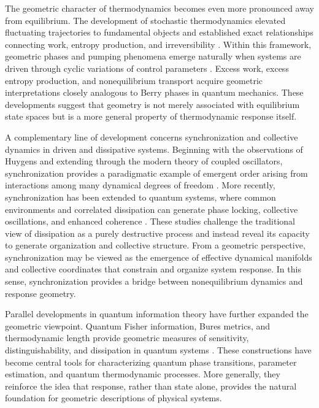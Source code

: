 The geometric character of thermodynamics becomes even more pronounced away from equilibrium. The development of stochastic thermodynamics elevated fluctuating trajectories to fundamental objects and established exact relationships connecting work, entropy production, and irreversibility \cite{Jarzynski1997,Crooks1999,Seifert2012}. Within this framework, geometric phases and pumping phenomena emerge naturally when systems are driven through cyclic variations of control parameters \cite{Sinitsyn2007,Sinitsyn2009}. Excess work, excess entropy production, and nonequilibrium transport acquire geometric interpretations closely analogous to Berry phases in quantum mechanics. These developments suggest that geometry is not merely associated with equilibrium state spaces but is a more general property of thermodynamic response itself.

A complementary line of development concerns synchronization and collective dynamics in driven and dissipative systems. Beginning with the observations of Huygens and extending through the modern theory of coupled oscillators, synchronization provides a paradigmatic example of emergent order arising from interactions among many dynamical degrees of freedom \cite{Kuramoto1984,Strogatz2003}. More recently, synchronization has been extended to quantum systems, where common environments and correlated dissipation can generate phase locking, collective oscillations, and enhanced coherence \cite{Mari2013,Giorgi2013,Bittner2024Sync,Bittner2025JCP}. These studies challenge the traditional view of dissipation as a purely destructive process and instead reveal its capacity to generate organization and collective structure. From a geometric perspective, synchronization may be viewed as the emergence of effective dynamical manifolds and collective coordinates that constrain and organize system response. In this sense, synchronization provides a bridge between nonequilibrium dynamics and response geometry.

Parallel developments in quantum information theory have further expanded the geometric viewpoint. Quantum Fisher information, Bures metrics, and thermodynamic length provide geometric measures of sensitivity, distinguishability, and dissipation in quantum systems \cite{Uhlmann1976,BraunsteinCaves1994,Zanardi2007,Gu2010,Paris2009}. These constructions have become central tools for characterizing quantum phase transitions, parameter estimation, and quantum thermodynamic processes. More generally, they reinforce the idea that response, rather than state alone, provides the natural foundation for geometric descriptions of physical systems.

